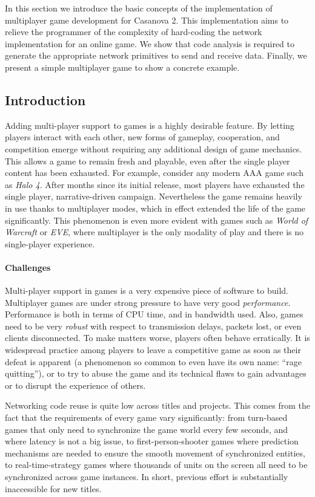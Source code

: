 In this section we introduce the basic concepts of the implementation of multiplayer game development for Casanova 2. This implementation aims to relieve the programmer of the complexity of hard-coding the network implementation for an online game. We show that code analysis is required to generate the appropriate network primitives to send and receive data. Finally, we present a simple multiplayer game to show a concrete example.

\subsection*{Introduction}
Adding multi-player support to games is a highly desirable feature. By letting players interact with each other, new forms of gameplay, cooperation, and competition emerge without requiring any additional design of game mechanics. This allows a game to remain fresh and playable, even after the single player content has been exhausted. For example, consider any modern AAA game such as \textit{Halo 4}. After months since its initial release, most players have exhausted the single player, narrative-driven campaign. Nevertheless the game remains heavily in use thanks to multiplayer modes, which in effect extended the life of the game significantly. This phenomenon is even more evident with games such as \textit{World of Warcraft} or \textit{EVE}, where multiplayer is the only modality of play and there is no single-player experience.

\paragraph*{Challenges}
Multi-player support in games is a very expensive piece of software to build. Multiplayer games are under strong pressure to have very good \textit{performance}. Performance is both in terms of CPU time, and in bandwidth used. Also, games need to be very \textit{robust} with respect to transmission delays, packets lost, or even clients disconnected. To make matters worse, players often behave erratically. It is widespread practice among players to leave a competitive game as soon as their defeat is apparent (a phenomenon so common to even have its own name: ``rage quitting''), or to try to abuse the game and its technical flaws to gain advantages or to disrupt the experience of others.

Networking code reuse is quite low across titles and projects. This comes from the fact that the requirements of every game vary significantly: from turn-based games that only need to synchronize the game world every few seconds, and where latency is not a big issue, to first-person-shooter games where prediction mechanisms are needed to ensure the smooth movement of synchronized entities, to real-time-strategy games where thousands of units on the screen all need to be synchronized across game instances. In short, previous effort is substantially inaccessible for new titles.



